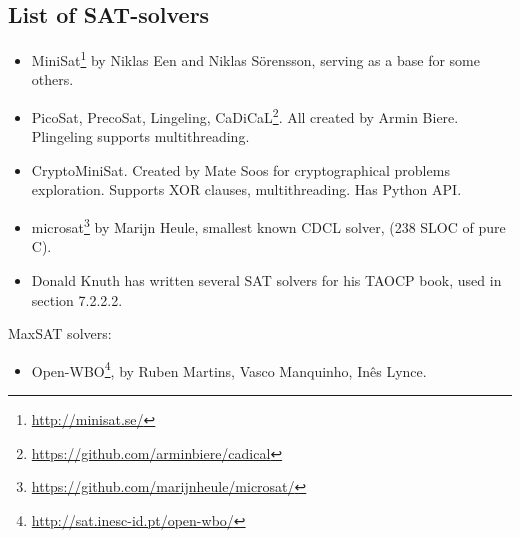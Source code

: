 \subsection{List of SAT-solvers}


\begin{itemize}

\item MiniSat\footnote{\url{http://minisat.se/}} by Niklas Een and Niklas Sörensson, serving as a base for some others.

\item PicoSat, PrecoSat, Lingeling, CaDiCaL\footnote{\url{https://github.com/arminbiere/cadical}}.
All created by Armin Biere. Plingeling supports multithreading.

\item CryptoMiniSat. Created by Mate Soos for cryptographical problems exploration.
Supports XOR clauses, multithreading.
Has Python API.

\item microsat\footnote{\url{https://github.com/marijnheule/microsat/}} by Marijn Heule, smallest known CDCL solver, (238 SLOC of pure C).

\item Donald Knuth has written several SAT solvers for his TAOCP book, used in section 7.2.2.2.

\end{itemize}

MaxSAT solvers:

\begin{itemize}

\item Open-WBO\footnote{\url{http://sat.inesc-id.pt/open-wbo/}}, by Ruben Martins, Vasco Manquinho, Inês Lynce.

\end{itemize}

